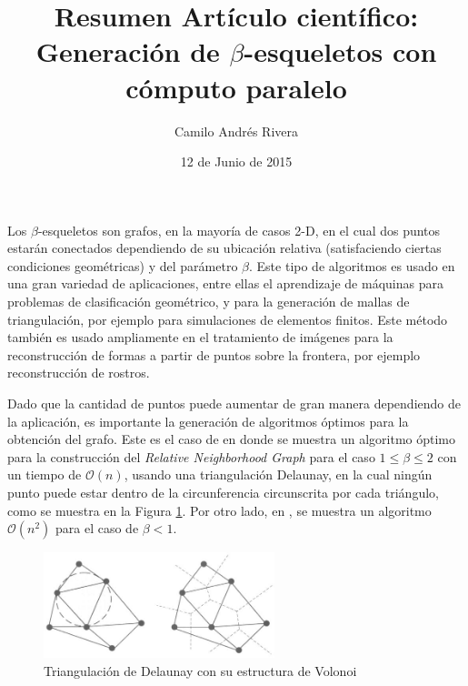 \documentclass{article}
\title{Resumen Artículo científico: Generación de $\beta$-esqueletos con cómputo paralelo \cite{beta}}
\author{Camilo Andrés Rivera}
\date{12 de Junio de 2015}
\begin{document}
\maketitle

Los $\beta$-esqueletos son grafos, en la mayoría de casos 2-D, en el cual dos puntos estarán conectados dependiendo de su ubicación relativa (satisfaciendo ciertas condiciones geométricas) y del parámetro $\beta$. Este tipo de algoritmos es usado en una gran variedad de aplicaciones, entre ellas el aprendizaje de máquinas para problemas de clasificación geométrico, y para la generación de mallas de triangulación, por ejemplo para simulaciones de elementos finitos. Este método también es usado ampliamente en el tratamiento de imágenes para la reconstrucción de formas a partir de puntos sobre la frontera, por ejemplo reconstrucción de rostros.

Dado que la cantidad de puntos puede aumentar de gran manera dependiendo de la aplicación, es importante la generación de algoritmos óptimos para la obtención del grafo. Este es el caso de \cite{unoados} en donde se muestra un algoritmo óptimo para la construcción del \textit{Relative Neighborhood Graph} para el caso $1\leq\beta\leq2$ con un tiempo de $\mathcal{O}(n)$, usando una triangulación Delaunay, en la cual ningún punto puede estar dentro de la circunferencia circunscrita por cada triángulo, como se muestra en la Figura \ref{fig:delaunay}. Por otro lado, en \cite{menosdeuno}, se muestra un algoritmo $\mathcal{O}(n^2)$ para el caso de $\beta<1$.

\begin{figure}[H]
\centering
\includegraphics[width=0.6\textwidth]{imagen}
\caption{Triangulación de Delaunay con su estructura de Volonoi}
\label{fig:delaunay}
\end{figure}
\end{document}
